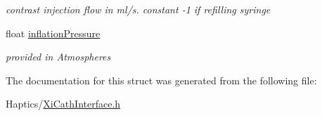 \begin{DoxyCompactItemize}
\begin{DoxyCompactList}\small\item\em contrast injection flow in ml/s. constant -\/1 if refilling syringe \item\end{DoxyCompactList}\item 
\hypertarget{structXiControlPanelState___a300fa376ee3aaa40dd55d08e495dd781}{
float \hyperlink{structXiControlPanelState___a300fa376ee3aaa40dd55d08e495dd781}{inflationPressure}}
\label{structXiControlPanelState___a300fa376ee3aaa40dd55d08e495dd781}

\begin{DoxyCompactList}\small\item\em provided in Atmospheres \item\end{DoxyCompactList}\end{DoxyCompactItemize}


The documentation for this struct was generated from the following file:\begin{DoxyCompactItemize}
\item 
Haptics/\hyperlink{XiCathInterface_8h}{XiCathInterface.h}\end{DoxyCompactItemize}

